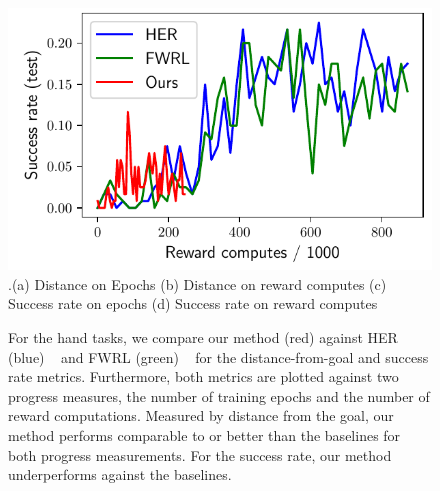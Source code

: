 \begin{figure}
  \includegraphics[width=\frac\columnwidth]{media/res/6efc1de-path_reward_low_thresh_chosen-HandManipulatePenRotate-v0-ddpg/reward_computes-test/success_rate.pdf}
  {.\tiny\color{blue}\hspace{0.8cm}(a) Distance on Epochs \hspace{1.05cm}(b) Distance on
    reward computes
    \hspace{0.70cm} (c) Success rate on epochs \hspace{0.9cm} (d) Success rate on reward computes}
  \caption{For the hand tasks, we compare our method (red) against HER (blue) ~\citep{andrychowicz2016learning}
    and FWRL (green) ~\citep{dhiman2018floydwarshall} for the distance-from-goal
    and success rate metrics. Furthermore, both metrics are plotted
    against two progress measures, the number of training epochs and the number of reward
    computations. Measured by distance from the goal, our method performs comparable to or
    better than the baselines for both progress measurements. For the success rate,
    our method underperforms against the baselines. 
}%
  \label{fig:hand-results}%
\end{figure}%
% 
